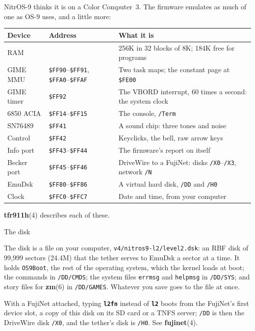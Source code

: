 \documentclass[10pt,twoside,openany]{book}
\makeatletter
\newcommand{\file}[1]{\texttt{#1}}           %
\newcommand{\rp}[2]{\textbf{#1}(#2)}         %
\newcommand{\type}[1]{\texttt{\textbf{#1}}}  %
\renewcommand{\subsection}{\@startsection{subsection}{2}{0pt}{2.4ex plus 0.6ex}{0.8ex}%
  {\sffamily\bfseries\normalsize}}
\makeatother
\begin{document}
NitrOS-9 thinks it is on a Color Computer~3. The firmware emulates as
much of one as OS-9 uses, and a little more:

\begin{tabularx}{\linewidth}{@{}l l X@{}}
\toprule
\textbf{Device} & \textbf{Address} & \textbf{What it is}\\
\midrule
RAM & & 256K in 32 blocks of 8K; 184K free for programs\\
GIME MMU & \file{\$FF90}--\file{\$FF91}, \file{\$FFA0}--\file{\$FFAF} & Two task maps; the constant page at \file{\$FE00}\\
GIME timer & \file{\$FF92} & The VBORD interrupt, 60 times a second: the system clock\\
6850 ACIA & \file{\$FF14}--\file{\$FF15} & The console, \file{/Term}\\
SN76489 & \file{\$FF41} & A sound chip: three tones and noise\\
Control & \file{\$FF42} & Keyclicks, the bell, raw arrow keys\\
Info port & \file{\$FF43}--\file{\$FF44} & The firmware's report on itself\\
Becker port & \file{\$FF45}--\file{\$FF46} & DriveWire to a FujiNet: disks \file{/X0}--\file{/X3}, network \file{/N}\\
EmuDsk & \file{\$FF80}--\file{\$FF86} & A virtual hard disk, \file{/DD} and \file{/H0}\\
Clock & \file{\$FFC0}--\file{\$FFC7} & Date and time, from your computer\\
\bottomrule
\end{tabularx}

\rp{tfr911h}{4} describes each of these.

\subsection{The disk}

The disk is a file on your computer, \file{v4/nitros9-l2/level2.dsk}: an
RBF disk of 99,999 sectors (24.4M) that the tether serves to EmuDsk a
sector at a time. It holds \file{OS9Boot}, the rest of the operating
system, which the kernel loads at boot; the commands in \file{/DD/CMDS};
the system files \file{errmsg} and \file{helpmsg} in \file{/DD/SYS}; and
story files for \rp{zm}{6} in \file{/DD/GAMES}. Whatever you save goes to
the file at once.

With a FujiNet attached, typing \type{l2fn} instead of \type{l2} boots from
the FujiNet's first device slot, a copy of this disk on its SD card or a
TNFS server; \file{/DD} is then the DriveWire disk \file{/X0}, and the
tether's disk is \file{/H0}. See \rp{fujinet}{4}.
\end{document}
